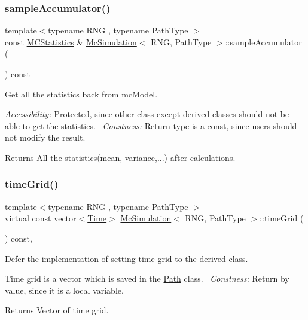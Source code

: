 \subsubsection{\texorpdfstring{sample\+Accumulator()}{sampleAccumulator()}}
{\footnotesize\ttfamily template$<$typename R\+NG , typename Path\+Type $>$ \\
const \hyperlink{class_m_c_statistics}{M\+C\+Statistics} \& \hyperlink{class_mc_simulation}{Mc\+Simulation}$<$ R\+NG, Path\+Type $>$\+::sample\+Accumulator (\begin{DoxyParamCaption}{ }\end{DoxyParamCaption}) const\hspace{0.3cm}{\ttfamily [protected]}}



Get all the statistics back from mc\+Model. 

{\itshape Accessibility\+:} Protected, since other class except derived classes should not be able to get the statistics.~\newline
{\itshape Constness\+:} Return type is a const, since users should not modify the result. \begin{DoxyReturn}{Returns}
All the statistics(mean, variance,...) after calculations. 
\end{DoxyReturn}
\hypertarget{class_mc_simulation_acf7d24981be3025a2cf07f8623dbe8ce}{}\label{class_mc_simulation_acf7d24981be3025a2cf07f8623dbe8ce} 
\subsubsection{\texorpdfstring{time\+Grid()}{timeGrid()}}
{\footnotesize\ttfamily template$<$typename R\+NG , typename Path\+Type $>$ \\
virtual const vector$<$\hyperlink{_name_def_8h_ac2d3e0ba793497bcca555c7c2cf64ff3}{Time}$>$ \hyperlink{class_mc_simulation}{Mc\+Simulation}$<$ R\+NG, Path\+Type $>$\+::time\+Grid (\begin{DoxyParamCaption}{ }\end{DoxyParamCaption}) const\hspace{0.3cm}{\ttfamily [private]}, {}}



Defer the implementation of setting time grid to the derived class. 

Time grid is a vector which is saved in the \hyperlink{class_path}{Path} class.~\newline
{\itshape Constness\+:} Return by value, since it is a local variable. \begin{DoxyReturn}{Returns}
Vector of time grid. 
\end{DoxyReturn}


